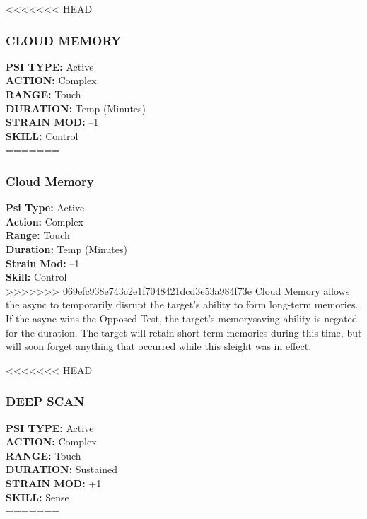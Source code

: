 <<<<<<< HEAD
\subsubsection{CLOUD MEMORY}
\textbf{PSI TYPE:} Active \\ 
\textbf{ACTION:} Complex \\ 
\textbf{RANGE:} Touch \\ 
\textbf{DURATION:} Temp (Minutes) \\
\textbf{STRAIN MOD:} –1 \\ 
\textbf{SKILL:} Control\\
=======
\subsubsection{Cloud Memory}
\textbf{Psi Type:} Active \\ 
\textbf{Action:} Complex \\ 
\textbf{Range:} Touch \\ 
\textbf{Duration:} Temp (Minutes) \\
\textbf{Strain Mod:} –1 \\ 
\textbf{Skill:} Control\\
>>>>>>> 069efc938e743c2e1f7048421dcd3e53a984f73e
Cloud Memory allows the async to temporarily disrupt
the target’s ability to form long-term memories. If
the async wins the Opposed Test, the target’s memorysaving
ability is negated for the duration. The target
will retain short-term memories during this time, but
will soon forget anything that occurred while this
sleight was in effect.

<<<<<<< HEAD
\subsubsection{DEEP SCAN}
\textbf{PSI TYPE:} Active \\ 
\textbf{ACTION:} Complex \\ 
\textbf{RANGE:} Touch \\ 
\textbf{DURATION:} Sustained \\
\textbf{STRAIN MOD:} +1 \\ 
\textbf{SKILL:} Sense\\
=======
